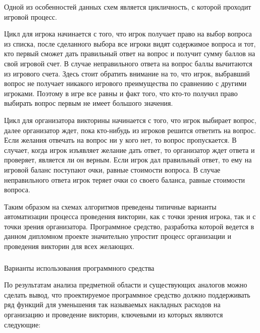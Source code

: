 Одной из особенностей данных схем является цикличность, с которой проходит игровой процесс. 

Цикл для игрока начинается с того, что игрок получает право на выбор вопроса из списка, после сделанного выбора все игроки видят содержимое вопроса и тот, кто первый 
сможет дать правильный ответ на вопрос и получит сумму баллов на свой игровой счет. В случае неправильного ответа на вопрос баллы вычитаются из игрового счета.
Здесь стоит обратить внимание на то, что игрок, выбравший вопрос не получает никакого игрового преимущества по сравнению с другими игроками. Поэтому в игре все равны и факт того,
что кто-то получил право выбирать вопрос первым не имеет большого значения.

Цикл для организатора викторины начинается с того, что игрок выбирает вопрос, далее организатор ждет, пока кто-нибудь из игроков решится ответить на вопрос. Если желания отвечать на 
вопрос ни у кого нет, то вопрос пропускается. В случает, когда игрок изъявляет желание дать ответ, то организатор ждет ответа и проверяет, является ли он верным. Если игрок дал правильный ответ,
то ему на игровой баланс поступают очки, равные стоимости вопроса. В случае неправильного ответа игрок теряет очки со своего баланса, равные стоимости вопроса.

Таким образом на схемах алгоритмов преведены типичные варианты автоматизации процесса проведения викторин, как с точки зрения игрока, так и с точки зрения организатора.
Программное средство, разработка которой ведется в данном дипломном проекте значительно упростит процесс организации и проведения викторин для всех желающих.

\subsubsection{} Варианты использования программного средства
\label{sec:domain:model:use_cases}

По результатам анализа предметной области и существующих аналогов можно сделать вывод, что проектируемое программное средство должно поддерживать ряд функций 
для уменьшения так называемых накладных расходов на организацию и проведение викторин, ключевыми из которых являются следующие:

